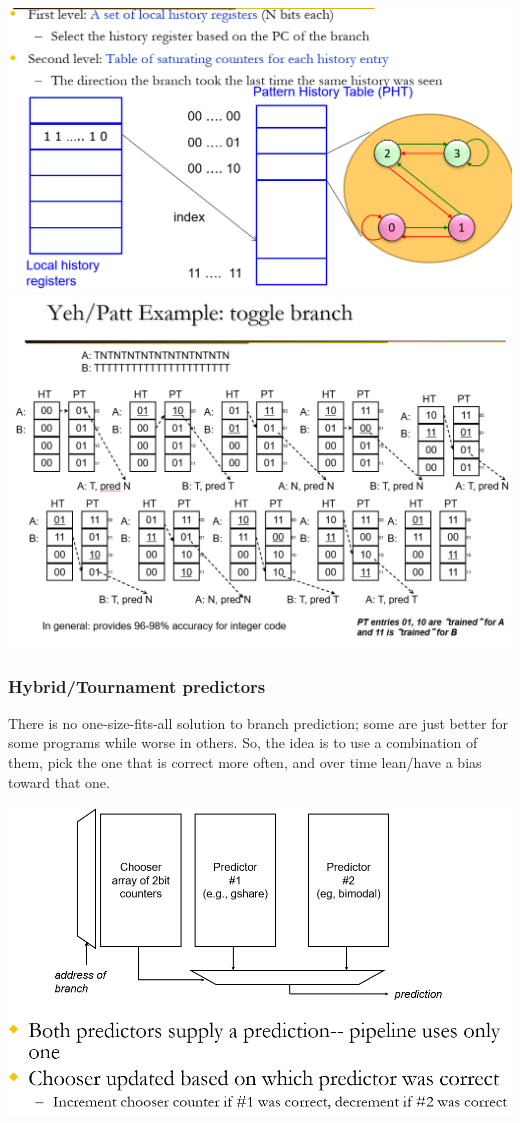 \documentclass[12pt]{extarticle}
\begin{document}
	\begin{center}
		\includegraphics[scale=0.5]{assets/yeh-patt-diagram.png}
		\includegraphics[scale=0.5]{assets/yeh-patt-example.png}
	\end{center}

	\subsubsection{Hybrid/Tournament predictors}

	There is no one-size-fits-all solution to branch prediction; some are just better for some programs while worse in 
	others. So, the idea is to use a combination of them, pick the one that is correct more often, and over time lean/have 
	a bias toward that one.

	\begin{center}
		\includegraphics[scale=0.5]{assets/hybrid-example.png}
	\end{center}
\end{document}

